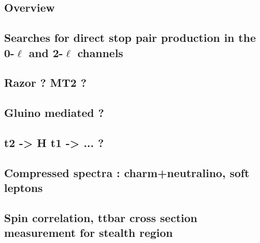         \loremipsum

        \subsection{Overview}


        \subsection{Searches for direct stop pair production in the 0-$\ell$ and 2-$\ell$ channels}
        

        \subsection{Razor ? MT2 ?}
        

        \subsection{Gluino mediated ?}
        
        \subsection{t2 -> H t1 -> ... ?}
        

        \subsection{Compressed spectra : charm+neutralino, soft leptons}



        \subsection{Spin correlation, ttbar cross section measurement for stealth region}



